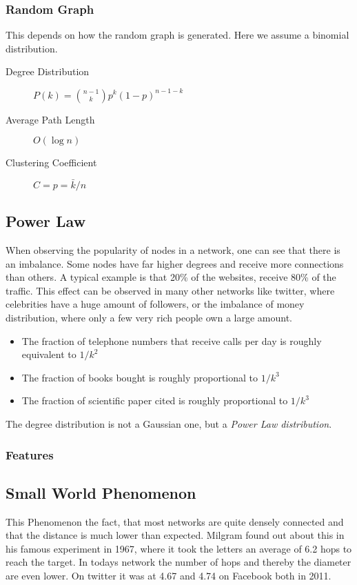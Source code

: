 	\subsubsection{Random Graph} %
	\label{ssub:random_graph}
	This depends on how the random graph is generated.
	Here we assume a binomial distribution.
		\begin{description}
			\item[Degree Distribution] $P(k) = \binom{n-1}{k}p^k(1-p)^{n-1-k}$
			\item[Average Path Length] $O(\log n)$
			\item[Clustering Coefficient] $C = p = \bar{k}/n$
		\end{description}

\subsection{Power Law} %
\label{sub:power_law}
When observing the popularity of nodes in a network,
one can see that there is an imbalance.
Some nodes have far higher degrees and receive more connections than others.
A typical example is that 20\% of the websites,
receive 80\% of the traffic.
This effect can be observed in many other networks like twitter,
where celebrities have a huge amount of followers,
or the imbalance of money distribution,
where only a few very rich people own a large amount.

\begin{itemize}
	\item The fraction of telephone numbers that receive calls per day is roughly equivalent to $1/k^2$
	\item The fraction of books bought is roughly proportional to $1/k^3$
	\item The fraction of scientific paper cited is roughly proportional to $1/k^3$
\end{itemize}

The degree distribution is not a Gaussian one,
but a \emph{Power Law distribution}.

	\subsubsection{Features} %
	\label{ssub:features}

\subsection{Small World Phenomenon} %
\label{sub:small_world_phenomenon}
This Phenomenon the fact,
that most networks are quite densely connected
and that the distance is much lower than expected.
Milgram found out about this in his famous experiment in 1967,
where it took the letters an average of 6.2 hops to reach the target.
In todays network the number of hops 
and thereby the diameter are even lower.
On twitter it was at 4.67 and 4.74 on Facebook both in 2011.

